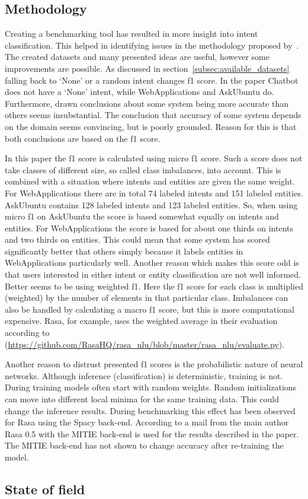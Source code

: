 \subsection{Methodology}
\label{subsec:methodology}
Creating a benchmarking tool has resulted in more insight into intent classification.
This helped in identifying issues in the methodology proposed by~\citet{braun2017}.
The created datasets and many presented ideas are useful, however some improvements are possible.
As discussed in section~\ref{subsec:available_datasets} falling back to `None' or a random intent changes f1 score.
In the paper Chatbot does not have a `None' intent, while WebApplications and AskUbuntu do.
Furthermore, drawn conclusions about some system being more accurate than others seems insubstantial.
The conclusion that accuracy of some system depends on the domain seems convincing, but is poorly grounded.
Reason for this is that both conclusions are based on the f1 score.

In this paper the f1 score is calculated using micro f1 score.
Such a score does not take classes of different size, so called class imbalances, into account.
This is combined with a situation where intents and entities are given the same weight.
For WebApplications there are in total 74 labeled intents and 151 labeled entities.
AskUbuntu contains 128 labeled intents and 123 labeled entities.
So, when using micro f1 on AskUbuntu the score is based somewhat equally on intents and entities.
For WebApplications the score is based for about one thirds on intents and two thirds on entities.
This could mean that some system has scored significantly better that others simply because it labels entities in WebApplications particularly well.
Another reason which makes this score odd is that users interested in either intent or entity classification are not well informed.
Better seems to be using weighted f1.
Here the f1 score for each class is multiplied (weighted) by the number of elements in that particular class.
Imbalances can also be handled by calculating a macro f1 score, but this is more computational expensive.
Rasa, for example, uses the weighted average in their evaluation according to (\url{https://github.com/RasaHQ/rasa_nlu/blob/master/rasa_nlu/evaluate.py}).

Another reason to distrust presented f1 scores is the probabilistic nature of neural networks.
Although inference (classification) is deterministic, training is not.
During training models often start with random weights.
Random initializations can move into different local minima for the same training data.
This could change the inference results.
During benchmarking this effect has been observed for Rasa using the Spacy back-end.
According to a mail from the main author Rasa 0.5 with the MITIE back-end is used for the results described in the paper.
The MITIE back-end has not shown to change accuracy after re-training the model.

\subsection{State of field}

